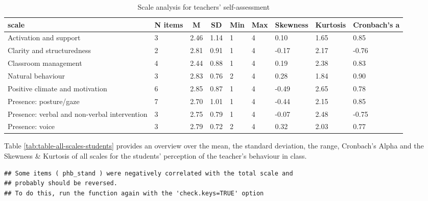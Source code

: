 \documentclass[
  english,
  man,floatsintext]{apa6}
\begin{document}
\begin{table}[h]

\begin{center}
\begin{threeparttable}

\caption{\label{tab:table-all-scales-self-assessment}Scale analysis for teachers' self-assessment}

\tiny{

\begin{tabular}{lllllllll}
\toprule
scale & \multicolumn{1}{c}{N items} & \multicolumn{1}{c}{M} & \multicolumn{1}{c}{SD} & \multicolumn{1}{c}{Min} & \multicolumn{1}{c}{Max} & \multicolumn{1}{c}{Skewness} & \multicolumn{1}{c}{Kurtosis} & \multicolumn{1}{c}{Cronbach's a}\\
\midrule
Activation and support & 3 & 2.46 & 1.14 & 1 & 4 & 0.10 & 1.65 & 0.85\\
Clarity and structuredness & 2 & 2.81 & 0.91 & 1 & 4 & -0.17 & 2.17 & -0.76\\
Classroom management & 4 & 2.44 & 0.88 & 1 & 4 & 0.19 & 2.38 & 0.83\\
Natural behaviour & 3 & 2.83 & 0.76 & 2 & 4 & 0.28 & 1.84 & 0.90\\
Positive climate and motivation & 6 & 2.85 & 0.87 & 1 & 4 & -0.49 & 2.65 & 0.78\\
Presence: posture/gaze & 7 & 2.70 & 1.01 & 1 & 4 & -0.44 & 2.15 & 0.85\\
Presence: verbal and non-verbal intervention & 3 & 2.75 & 0.79 & 1 & 4 & -0.07 & 2.48 & -0.75\\
Presence: voice & 3 & 2.79 & 0.72 & 2 & 4 & 0.32 & 2.03 & 0.77\\
\bottomrule
\end{tabular}

}

\end{threeparttable}
\end{center}

\end{table}

Table \ref{tab:table-all-scales-students} provides an overview over the mean, the standard deviation, the range, Cronbach's Alpha and the Skewness \& Kurtosis of all scales for the students' perception of the teacher's behaviour in class.

\begin{verbatim}
## Some items ( phb_stand ) were negatively correlated with the total scale and 
## probably should be reversed.  
## To do this, run the function again with the 'check.keys=TRUE' option
\end{verbatim}
\end{document}
